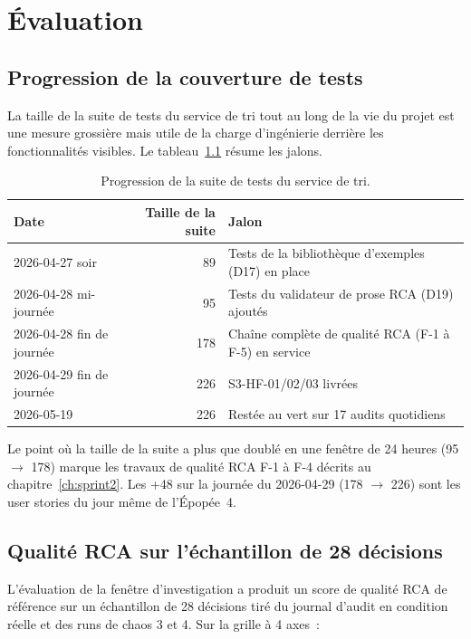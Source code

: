 \documentclass[11pt,a4paper,oneside]{report}
\begin{document}
\chapter{Évaluation}
\label{ch:evaluation}

\section{Progression de la couverture de tests}

La taille de la suite de tests du service de tri tout au long de la
vie du projet est une mesure grossière mais utile de la charge
d'ingénierie derrière les fonctionnalités visibles. Le
tableau~\ref{tab:tests} résume les jalons.

\begin{table}[h]
\centering
\small
\begin{tabular}{lrl}
\toprule
\textbf{Date} & \textbf{Taille de la suite} & \textbf{Jalon} \\
\midrule
2026-04-27 soir & 89  & Tests de la bibliothèque d'exemples (D17) en place \\
2026-04-28 mi-journée & 95  & Tests du validateur de prose RCA (D19) ajoutés \\
2026-04-28 fin de journée    & 178 & Chaîne complète de qualité RCA (F-1 à F-5) en service \\
2026-04-29 fin de journée    & 226 & S3-HF-01/02/03 livrées \\
2026-05-19        & 226 & Restée au vert sur 17 audits quotidiens \\
\bottomrule
\end{tabular}
\caption{Progression de la suite de tests du service de tri.}
\label{tab:tests}
\end{table}

Le point où la taille de la suite a plus que doublé en une fenêtre
de 24 heures (95 $\to$ 178) marque les travaux de qualité RCA
F-1 à F-4 décrits au chapitre~\ref{ch:sprint2}. Les +48 sur la
journée du 2026-04-29 (178 $\to$ 226) sont les user stories du
jour même de l'Épopée~4.

\section{Qualité RCA sur l'échantillon de 28 décisions}

L'évaluation de la fenêtre d'investigation a produit un score de
qualité RCA de référence sur un échantillon de 28 décisions tiré du
journal d'audit en condition réelle et des runs de chaos 3 et 4.
Sur la grille à 4 axes~:
\end{document}

